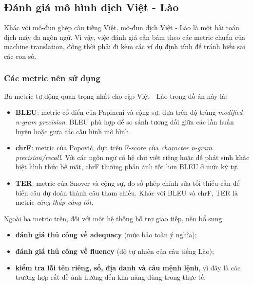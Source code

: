 ﻿\subsection{Đánh giá mô hình dịch Việt - Lào}

Khác với mô-đun ghép câu tiếng Việt, mô-đun dịch Việt - Lào là một bài toán dịch máy đa
ngôn ngữ. Vì vậy, việc đánh giá cần bám theo các metric chuẩn của machine translation,
đồng thời phải đi kèm các ví dụ định tính để tránh hiểu sai các con số.

\subsubsection{Các metric nên sử dụng}

Ba metric tự động quan trọng nhất cho cặp Việt - Lào trong đồ án này là:
\begin{itemize}
    \item \textbf{BLEU}: metric cổ điển của Papineni và cộng sự, dựa trên độ trùng
    \textit{modified n-gram precision}. BLEU phù hợp để so sánh tương đối giữa các lần
    huấn luyện hoặc giữa các cấu hình mô hình.
    \item \textbf{chrF}: metric của Popovi\'{c}, dựa trên F-score của \textit{character
    n-gram precision/recall}. Với các ngôn ngữ có hệ chữ viết riêng hoặc dễ phát sinh khác
    biệt hình thức bề mặt, chrF thường phản ánh tốt hơn BLEU ở mức ký tự.
    \item \textbf{TER}: metric của Snover và cộng sự, đo số phép chỉnh sửa tối thiểu cần để
    biến câu dự đoán thành câu tham chiếu. Khác với BLEU và chrF, TER là metric
    \textit{càng thấp càng tốt}.
\end{itemize}

Ngoài ba metric trên, đối với một hệ thống hỗ trợ giao tiếp, nên bổ sung:
\begin{itemize}
    \item \textbf{đánh giá thủ công về adequacy} (mức bảo toàn ý nghĩa);
    \item \textbf{đánh giá thủ công về fluency} (độ tự nhiên của câu tiếng Lào);
    \item \textbf{kiểm tra lỗi tên riêng, số, địa danh và câu mệnh lệnh}, vì đây là các trường
    hợp rất dễ ảnh hưởng đến khả năng dùng trong thực tế.
\end{itemize}

